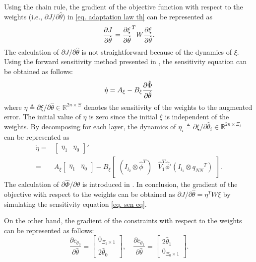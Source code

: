 \documentclass[letterpaper, 10 pt, conference]{ieeeconf}  %
\begin{document}
Using the chain rule, the gradient of the objective function with respect to the weights (i.e., $\partial J/\partial \hat\theta$) in \eqref{eq. adaptation law th} can be represented as
\begin{equation*}
    {\partial J\over\partial \hat\theta}
    =
    {\partial \xi\over\partial \hat\theta}^TW
    {\partial \xi\over\partial \hat\theta}
    .
\end{equation*}
The calculation of $\partial J/\partial \hat\theta$ is not straightforward because of the dynamics of $\xi$.
Using the forward sensitivity method presented in \cite{RN34}, the sensitivity equation can be obtained as follows:
\begin{equation}
    \dot \eta =A_\xi - B_\xi 
    {\partial \hat\Phi\over\partial \hat\theta}
    \label{eq. sen eq}
\end{equation}
where $\eta\triangleq \partial \xi/\partial \hat\theta\in\mathbb R^{2n\times \Xi}$ denotes the sensitivity of the weights to the augmented error.
The initial value of $\eta$ is zero since the initial $\xi$ is independent of the weights.
By decomposing for each layer, the dynamics of $\eta_i\triangleq \partial \xi/\partial \hat\theta_i\in\mathbb R^{2n\times \Xi_i}$ can be represented as
\begin{equation*}
    \begin{aligned}
        \dot\eta =&
        \begin{bmatrix}
            \eta_1&\eta_0
        \end{bmatrix}'
        \\
        =&A_\xi
        \begin{bmatrix}
            \eta_1&\eta_0
        \end{bmatrix}
        -B_\xi
        \begin{bmatrix}
            (I_{l_2}\otimes \hat\phi^T)&\hat V_1^T\hat\phi'(I_{l_1}\otimes {q_{NN}}^T)
        \end{bmatrix}
        .
    \end{aligned}
\end{equation*}
The calculation of $\partial \hat\Phi/\partial\hat\theta$ is introduced in \cite{RN36}.
In conclusion, the gradient of the objective with respect to the weights can be obtained as ${\partial J/\partial \hat\theta} = \eta^TW\xi$ by simulating the sensitivity equation \eqref{eq. sen eq}.

On the other hand, the gradient of the constraints with respect to the weights can be represented as follows:
\begin{equation*}
    \frac{\partial c_{\theta_0}}{\partial\hat\theta}
    = 
    \begin{bmatrix}
        0_{\Xi_1\times 1} \\
        2\hat\theta_0 
    \end{bmatrix}
    ,\quad
    \frac{\partial c_{\theta_1}}{\partial\hat\theta}    
    = 
    \begin{bmatrix}
        2\hat\theta_1 \\
        0_{\Xi_0\times 1}
    \end{bmatrix}
    .
\end{equation*}
\end{document}
